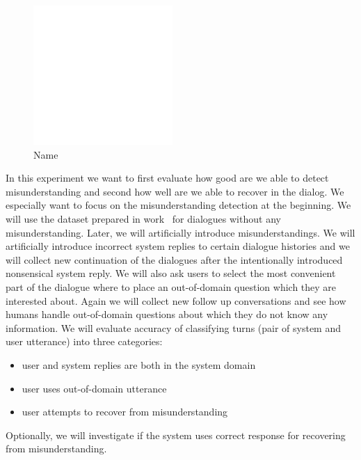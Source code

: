 \documentclass[11pt]{article}
\begin{document}
\begin{figure}[htpb]
    \centering
    \includegraphics[width=0.8\linewidth]{todo}
    \caption{Name}
    \label{fig:ambiguity_example}
\end{figure}

In this experiment we want to first evaluate how good are we able to detect misunderstanding and second how well are we able to recover in the dialog. 
We especially want to focus on the misunderstanding detection at the beginning.
We will use the dataset prepared in work~\cite{platek2016wochat} for dialogues without any misunderstanding.
Later, we will artificially introduce misunderstandings.
We will artificially introduce incorrect system replies to certain dialogue histories and we will collect new continuation of the dialogues after the intentionally introduced nonsensical system reply. 
We will also ask users to select the most convenient part of the dialogue where to place an out-of-domain question which they are interested about.
Again we will collect new follow up conversations and see how humans handle out-of-domain questions about which they do not know any information.
We will evaluate accuracy of classifying turns (pair of system and user utterance) into three categories:
\begin{itemize}
    \item user and system replies are both in the system domain 
    \item user uses out-of-domain utterance 
    \item user attempts to recover from misunderstanding
\end{itemize}
Optionally, we will investigate if the system uses correct response for recovering from misunderstanding.
\end{document}
